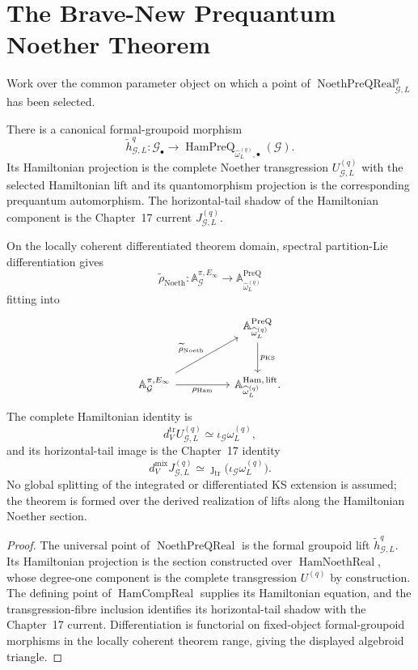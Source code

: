 \section{The Brave-New Prequantum Noether Theorem}
\label{sec:prequantum-noether-theorem}

Work over the common parameter object on which a point of
$\operatorname{NoethPreQReal}_{\mathcal G,L}^{q}$ has been selected.

\begin{theorem}
\label{thm:prequantum-noether-theorem}
There is a canonical formal-groupoid morphism
\[
\boxed{
\widetilde h_{\mathcal G,L}^{q}:
\mathcal G_\bullet
\longrightarrow
\operatorname{HamPreQ}_{\widehat\omega_L^{(q)},\bullet}(\mathcal G).
}
\]
Its Hamiltonian projection is the complete Noether transgression
$U_{\mathcal G,L}^{(q)}$ with the selected Hamiltonian lift and its quantomorphism
projection is the corresponding prequantum automorphism.  The horizontal-tail
shadow of the Hamiltonian component is the Chapter~17 current
$J_{\mathcal G,L}^{(q)}$.

On the locally coherent differentiated theorem domain, spectral partition-Lie
differentiation gives
\[
\boxed{
\widetilde\rho_{\mathrm{Noeth}}:
\mathbb A_{\mathcal G}^{\pi,E_\infty}
\longrightarrow
\mathbb A_{\widehat\omega_L^{(q)}}^{\mathrm{PreQ}}
}
\]
fitting into
\[
\begin{tikzcd}[column sep=huge,row sep=large]
& \mathbb A_{\widehat\omega_L^{(q)}}^{\mathrm{PreQ}}
  \arrow[d,"p_{\mathrm{KS}}"] \\
\mathbb A_{\mathcal G}^{\pi,E_\infty}
  \arrow[r,"\rho_{\mathrm{Ham}}"']
  \arrow[ur,"\widetilde\rho_{\mathrm{Noeth}}"] &
\mathbb A_{\widehat\omega_L^{(q)}}^{\mathrm{Ham,\,lift}}.
\end{tikzcd}
\]
The complete Hamiltonian identity is
\[
\boxed{
d_V^{\mathrm{tr}}U_{\mathcal G,L}^{(q)}
\simeq
\iota_{\mathcal G}\omega_L^{(q)},
}
\]
and its horizontal-tail image is the Chapter~17 identity
\[
d_V^{\mathrm{mix}}J_{\mathcal G,L}^{(q)}
\simeq
\jmath_{\mathrm{tr}}
\bigl(\iota_{\mathcal G}\omega_L^{(q)}\bigr).
\]
No global splitting of the integrated or differentiated KS extension is assumed; the theorem is formed over the derived realization of lifts along the Hamiltonian Noether section.
\end{theorem}

\begin{proof}
The universal point of $\operatorname{NoethPreQReal}$ is the formal groupoid lift
$\widetilde h_{\mathcal G,L}^{q}$.  Its Hamiltonian projection is the section
constructed over $\operatorname{HamNoethReal}$, whose degree-one component is the
complete transgression $U^{(q)}$ by construction.  The defining point of
$\operatorname{HamCompReal}$ supplies its Hamiltonian equation, and the
transgression-fibre inclusion identifies its horizontal-tail shadow with the
Chapter~17 current.  Differentiation is functorial on fixed-object formal-groupoid
morphisms in the locally coherent theorem range, giving the displayed algebroid
triangle.
\end{proof}

